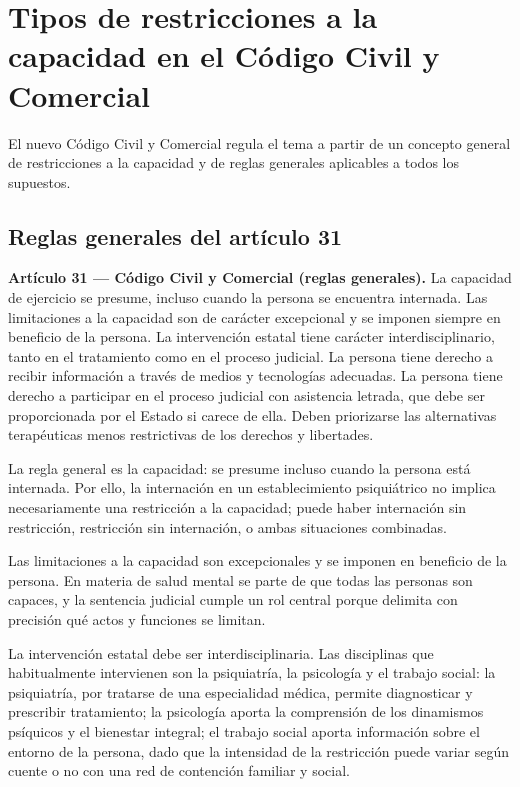 \documentclass[12pt,oneside]{book}
\begin{document}
\chapter{Tipos de restricciones a la capacidad en el Código Civil y Comercial}
\label{ch:bloque2}

El nuevo Código Civil y Comercial regula el tema a partir de un concepto general de restricciones a la capacidad y de reglas generales aplicables a todos los supuestos.

\section{Reglas generales del artículo 31}

\begin{important}
\textbf{Artículo 31 --- Código Civil y Comercial (reglas generales).} La capacidad de ejercicio se presume, incluso cuando la persona se encuentra internada. Las limitaciones a la capacidad son de carácter excepcional y se imponen siempre en beneficio de la persona. La intervención estatal tiene carácter interdisciplinario, tanto en el tratamiento como en el proceso judicial. La persona tiene derecho a recibir información a través de medios y tecnologías adecuadas. La persona tiene derecho a participar en el proceso judicial con asistencia letrada, que debe ser proporcionada por el Estado si carece de ella. Deben priorizarse las alternativas terapéuticas menos restrictivas de los derechos y libertades.
\end{important}

La regla general es la capacidad: se presume incluso cuando la persona está internada. Por ello, la internación en un establecimiento psiquiátrico no implica necesariamente una restricción a la capacidad; puede haber internación sin restricción, restricción sin internación, o ambas situaciones combinadas.

Las limitaciones a la capacidad son excepcionales y se imponen en beneficio de la persona. En materia de salud mental se parte de que todas las personas son capaces, y la sentencia judicial cumple un rol central porque delimita con precisión qué actos y funciones se limitan.

La intervención estatal debe ser interdisciplinaria. Las disciplinas que habitualmente intervienen son la psiquiatría, la psicología y el trabajo social: la psiquiatría, por tratarse de una especialidad médica, permite diagnosticar y prescribir tratamiento; la psicología aporta la comprensión de los dinamismos psíquicos y el bienestar integral; el trabajo social aporta información sobre el entorno de la persona, dado que la intensidad de la restricción puede variar según cuente o no con una red de contención familiar y social.
\end{document}
